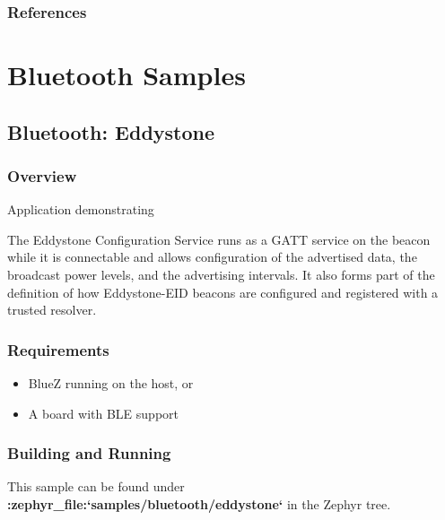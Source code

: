 \documentclass[letterpaper,10pt,english]{sphinxmanual}
\begin{document}
\subsubsection{References}
\label{\detokenize{samples/gui/lvtouch/README:references}}

\section{Bluetooth Samples}
\label{\detokenize{samples/bluetooth/bluetooth:bluetooth-samples}}\label{\detokenize{samples/bluetooth/bluetooth:id1}}\label{\detokenize{samples/bluetooth/bluetooth::doc}}

\subsection{Bluetooth: Eddystone}
\label{\detokenize{samples/bluetooth/eddystone/README:bluetooth-eddystone}}\label{\detokenize{samples/bluetooth/eddystone/README:bluetooth-eddystone-sample}}\label{\detokenize{samples/bluetooth/eddystone/README::doc}}

\subsubsection{Overview}
\label{\detokenize{samples/bluetooth/eddystone/README:overview}}
Application demonstrating 

The Eddystone Configuration Service runs as a GATT service on the beacon while
it is connectable and allows configuration of the advertised data, the
broadcast power levels, and the advertising intervals. It also forms part of
the definition of how Eddystone-EID beacons are configured and registered with
a trusted resolver.


\subsubsection{Requirements}
\label{\detokenize{samples/bluetooth/eddystone/README:requirements}}\begin{itemize}
\item {} 
BlueZ running on the host, or

\item {} 
A board with BLE support

\end{itemize}


\subsubsection{Building and Running}
\label{\detokenize{samples/bluetooth/eddystone/README:building-and-running}}
This sample can be found under {\color{red}\bfseries{}:zephyr\_file:{}`samples/bluetooth/eddystone{}`} in the
Zephyr tree.
\end{document}
